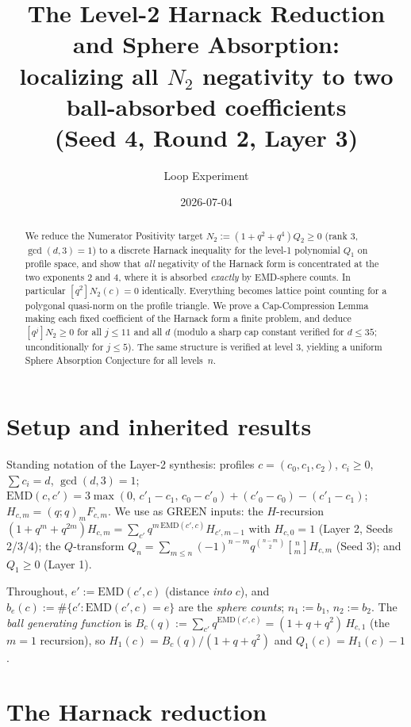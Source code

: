 \documentclass[11pt]{article}
\title{The Level-2 Harnack Reduction and Sphere Absorption:\\
localizing all $N_2$ negativity to two ball-absorbed coefficients\\
{\large (Seed 4, Round 2, Layer 3)}}
\author{Loop Experiment}
\date{2026-07-04}
\newcommand{\EMD}{\mathrm{EMD}}
\begin{document}
\maketitle

\begin{abstract}
We reduce the Numerator Positivity target $N_2 := (1+q^2+q^4)Q_2 \geq 0$
(rank $3$, $\gcd(d,3)=1$) to a discrete Harnack inequality for the
level-1 polynomial $Q_1$ on profile space, and show that \emph{all}
negativity of the Harnack form is concentrated at the two exponents $2$
and $4$, where it is absorbed \emph{exactly} by EMD-sphere counts. In
particular $[q^2]N_2(c)=0$ identically. Everything becomes lattice point
counting for a polygonal quasi-norm on the profile triangle. We prove a
Cap-Compression Lemma making each fixed coefficient of the Harnack form a
finite problem, and deduce $[q^j]N_2 \geq 0$ for all $j\leq 11$ and all
$d$ (modulo a sharp cap constant verified for $d\leq 35$; unconditionally
for $j \le 5$). The same structure is verified at level 3, yielding a
uniform Sphere Absorption Conjecture for all levels~$n$.
\end{abstract}

\section{Setup and inherited results}

Standing notation of the Layer-2 synthesis: profiles $c=(c_0,c_1,c_2)$,
$c_i\geq 0$, $\sum c_i = d$, $\gcd(d,3)=1$;
$\EMD(c,c') = 3\max(0,\,c'_1-c_1,\,c_0-c'_0) + (c'_0-c_0) - (c'_1-c_1)$;
$H_{c,m} = (q;q)_m F_{c,m}$. We use as GREEN inputs: the $H$-recursion
$(1+q^m+q^{2m})H_{c,m} = \sum_{c'} q^{m\,\EMD(c',c)} H_{c',m-1}$ with
$H_{c,0}=1$ (Layer 2, Seeds 2/3/4); the $Q$-transform
$Q_n = \sum_{m\leq n} (-1)^{n-m} q^{\binom{n-m}{2}} \genfrac{[}{]}{0pt}{}{n}{m} H_{c,m}$
(Seed 3); and $Q_1 \geq 0$ (Layer 1).

Throughout, $e' := \EMD(c',c)$ (distance \emph{into} $c$), and
$b_e(c) := \#\{c' : \EMD(c',c) = e\}$ are the \emph{sphere counts};
$n_1 := b_1$, $n_2 := b_2$. The \emph{ball generating function} is
$B_c(q) := \sum_{c'} q^{\EMD(c',c)} = (1+q+q^2)\,H_{c,1}$ (the $m=1$
recursion), so $H_1(c) = B_c(q)/(1+q+q^2)$ and
$Q_1(c) = H_1(c) - 1$.

\section{The Harnack reduction}
\end{document}
